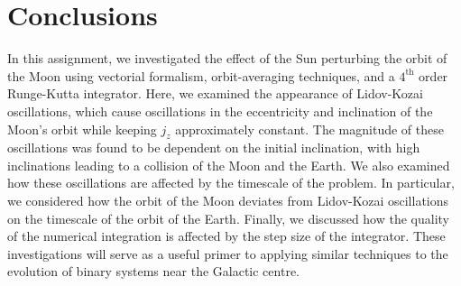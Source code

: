 \documentclass[11pt]{article}
\begin{document}
\section*{Conclusions}
In this assignment, we investigated the effect of the Sun perturbing the orbit of the Moon using vectorial formalism, orbit-averaging techniques, and a $4^\mathrm{th}$ order Runge-Kutta integrator. Here, we examined the appearance of Lidov-Kozai oscillations, which cause oscillations in the eccentricity and inclination of the Moon's orbit while keeping $j_z$ approximately constant. The magnitude of these oscillations was found to be dependent on the initial inclination, with high inclinations leading to a collision of the Moon and the Earth. We also examined how these oscillations are affected by the timescale of the problem. In particular, we considered how the orbit of the Moon deviates from Lidov-Kozai oscillations on the timescale of the orbit of the Earth. Finally, we discussed how the quality of the numerical integration is affected by the step size of the integrator. These investigations will serve as a useful primer to applying similar techniques to the evolution of binary systems near the Galactic centre.

\printbibliography
\end{document}
